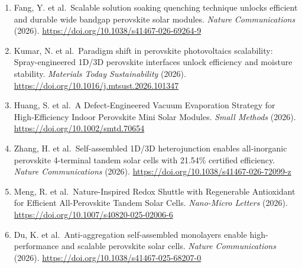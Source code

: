 \documentclass[
  11pt,
]{article}
\begin{document}
\begin{enumerate}
  Slot-Die-Coated Formamidinium Lead Iodide Solar Devices via Ambient
  Air Annealing. \emph{ACS Applied Materials \& Interfaces} (2026).
  \url{https://doi.org/10.1021/acsami.5c22032}
\item
  Fang, Y. et al.~Scalable solution soaking quenching technique unlocks
  efficient and durable wide bandgap perovskite solar modules.
  \emph{Nature Communications} (2026).
  \url{https://doi.org/10.1038/s41467-026-69264-9}
\item
  Kumar, N. et al.~Paradigm shift in perovskite photovoltaics
  scalability: Spray-engineered 1D/3D perovskite interfaces unlock
  efficiency and moisture stability. \emph{Materials Today
  Sustainability} (2026).
  \url{https://doi.org/10.1016/j.mtsust.2026.101347}
\item
  Huang, S. et al.~A Defect‐Engineered Vacuum Evaporation Strategy for
  High‐Efficiency Indoor Perovskite Mini Solar Modules. \emph{Small
  Methods} (2026). \url{https://doi.org/10.1002/smtd.70654}
\item
  Zhang, H. et al.~Self-assembled 1D/3D heterojunction enables
  all-inorganic perovskite 4-terminal tandem solar cells with 21.54\%
  certified efficiency. \emph{Nature Communications} (2026).
  \url{https://doi.org/10.1038/s41467-026-72099-z}
\item
  Meng, R. et al.~Nature-Inspired Redox Shuttle with Regenerable
  Antioxidant for Efficient All-Perovskite Tandem Solar Cells.
  \emph{Nano-Micro Letters} (2026).
  \url{https://doi.org/10.1007/s40820-025-02006-6}
\item
  Du, K. et al.~Anti-aggregation self-assembled monolayers enable
  high-performance and scalable perovskite solar cells. \emph{Nature
  Communications} (2026).
  \url{https://doi.org/10.1038/s41467-025-68207-0}
\end{enumerate}
\end{document}

